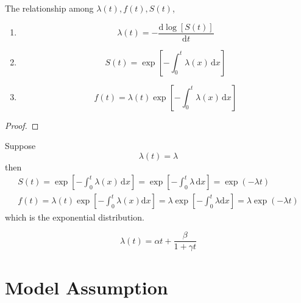 \begin{property}
    The relationship among $\lambda(t),f(t),S(t)$,
    \begin{enumerate}
        \item
              \begin{equation}
                  \lambda(t)=-\frac{\mathrm{d}\log [S(t)]}{\mathrm{d}t}
              \end{equation}
        \item
              \begin{equation}
                  S(t)=\exp\left[-\int_{0}^{t}\lambda(x)\,\mathrm{d}x\right]
              \end{equation}
        \item
              \begin{equation}
                  f(t)=\lambda(t)\exp\left[-\int_{0}^{t}\lambda(x)\,\mathrm{d}x\right]
              \end{equation}
    \end{enumerate}
\end{property}

\begin{proof}

\end{proof}

\begin{example}
    Suppose
    \begin{equation}
        \lambda(t)=\lambda
    \end{equation}
    then
    \begin{gather*}
        S(t)=\exp\left[-\int_{0}^{t}\lambda(x)\,\mathrm{d}x\right]=\exp\left[-\int_{0}^{t}\lambda\,\mathrm{d}x\right]=\exp(-\lambda t) \\
        f(t)=\lambda(t)\exp\left[-\int_{0}^{t}\lambda(x)\mathrm{d}x\right]=\lambda\exp\left[-\int_{0}^{t}\lambda\mathrm{d}x\right]=\lambda\exp(-\lambda t)
    \end{gather*}
    which is the exponential distribution.
\end{example}

\begin{example}
    \begin{equation}
        \lambda(t)=\alpha t+\frac{\beta}{1+\gamma t}
    \end{equation}
\end{example}

\section{Model Assumption}

